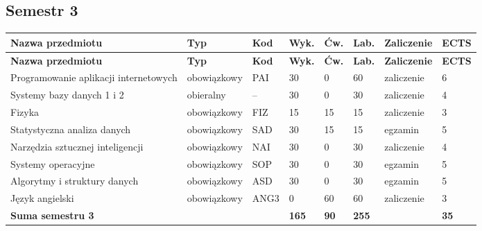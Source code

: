 \documentclass[12pt,a4paper]{article}
\newcommand{\thdrule}{\noalign{\global\setlength{\extrarowheight}{0pt}}}
\newcommand{\thdend}{\noalign{\global\setlength{\extrarowheight}{4pt}}}
\begin{document}
\subsection*{Semestr 3}

{\scriptsize
\begin{longtable}{m{5.0cm}m{1.9cm}m{0.75cm}m{0.85cm}m{0.85cm}m{0.85cm}m{1.45cm}m{0.9cm}}
\thdrule\toprule
\rowcolor{pjatkRed}
{\color{white}\footnotesize\textbf{\vphantom{Ag}Nazwa przedmiotu}} & {\color{white}\footnotesize\textbf{\vphantom{Ag}Typ}} & {\color{white}\footnotesize\textbf{\vphantom{Ag}Kod}} & {\color{white}\footnotesize\textbf{\vphantom{Ag}Wyk.}} & {\color{white}\footnotesize\textbf{\vphantom{Ag}Ćw.}} & {\color{white}\footnotesize\textbf{\vphantom{Ag}Lab.}} & {\color{white}\footnotesize\textbf{\vphantom{Ag}Zaliczenie}} & {\color{white}\footnotesize\textbf{\vphantom{Ag}ECTS}} \\
\midrule\thdend
\endfirsthead
\thdrule\toprule
\rowcolor{pjatkRed}
{\color{white}\footnotesize\textbf{\vphantom{Ag}Nazwa przedmiotu}} & {\color{white}\footnotesize\textbf{\vphantom{Ag}Typ}} & {\color{white}\footnotesize\textbf{\vphantom{Ag}Kod}} & {\color{white}\footnotesize\textbf{\vphantom{Ag}Wyk.}} & {\color{white}\footnotesize\textbf{\vphantom{Ag}Ćw.}} & {\color{white}\footnotesize\textbf{\vphantom{Ag}Lab.}} & {\color{white}\footnotesize\textbf{\vphantom{Ag}Zaliczenie}} & {\color{white}\footnotesize\textbf{\vphantom{Ag}ECTS}} \\
\midrule\thdend
\endhead
\rowcolor{tableRowLight} Programowanie aplikacji internetowych & {\scriptsize obowiązkowy} & PAI & 30 & 0 & 60 & {\scriptsize zaliczenie} & 6 \\
\rowcolor{tableElective} Systemy bazy danych 1 i 2 & {\scriptsize obieralny} & -- & 30 & 0 & 30 & {\scriptsize zaliczenie} & 4 \\
\rowcolor{tableRowAlt} Fizyka & {\scriptsize obowiązkowy} & FIZ & 15 & 15 & 15 & {\scriptsize zaliczenie} & 3 \\
\rowcolor{tableRowLight} Statystyczna analiza danych & {\scriptsize obowiązkowy} & SAD & 30 & 15 & 15 & {\scriptsize egzamin} & 5 \\
\rowcolor{tableRowAlt} Narzędzia sztucznej inteligencji & {\scriptsize obowiązkowy} & NAI & 30 & 0 & 30 & {\scriptsize zaliczenie} & 4 \\
\rowcolor{tableRowLight} Systemy operacyjne & {\scriptsize obowiązkowy} & SOP & 30 & 0 & 30 & {\scriptsize egzamin} & 5 \\
\rowcolor{tableRowAlt} Algorytmy i struktury danych & {\scriptsize obowiązkowy} & ASD & 30 & 0 & 30 & {\scriptsize egzamin} & 5 \\
\rowcolor{tableRowLight} Język angielski & {\scriptsize obowiązkowy} & ANG3 & 0 & 60 & 60 & {\scriptsize zaliczenie} & 3 \\
\midrule[\heavyrulewidth]
\rowcolor{tableSummary} \textbf{Suma semestru 3} & & & \textbf{165} & \textbf{90} & \textbf{255} & & \textbf{35} \\
\bottomrule
\end{longtable}}
\end{document}
